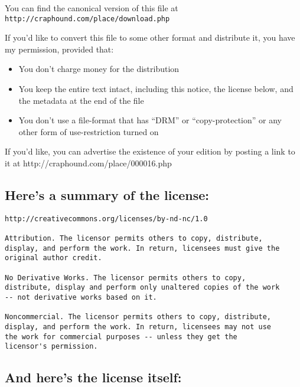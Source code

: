 You can find the canonical version of this file at\\
\texttt{http://craphound.com/place/download.php}

If you'd like to convert this file to some other format and
distribute it, you have my permission, provided that:

\begin{itemize}
\item
  You don't charge money for the distribution

\item
  You keep the entire text intact, including this notice, the license
  below, and the metadata at the end of the file

\item
  You don't use a file-format that has ``DRM'' or ``copy-protection''
  or any other form of use-restriction turned on

\end{itemize}
If you'd like, you can advertise the existence of your edition by
posting a link to it at http://craphound.com/place/000016.php


\subsection{Here's a summary of the license:}

\begin{verbatim}
http://creativecommons.org/licenses/by-nd-nc/1.0

Attribution. The licensor permits others to copy, distribute,
display, and perform the work. In return, licensees must give the
original author credit.

No Derivative Works. The licensor permits others to copy,
distribute, display and perform only unaltered copies of the work
-- not derivative works based on it.

Noncommercial. The licensor permits others to copy, distribute,
display, and perform the work. In return, licensees may not use
the work for commercial purposes -- unless they get the
licensor's permission.
\end{verbatim}

\subsection{And here's the license itself:}

